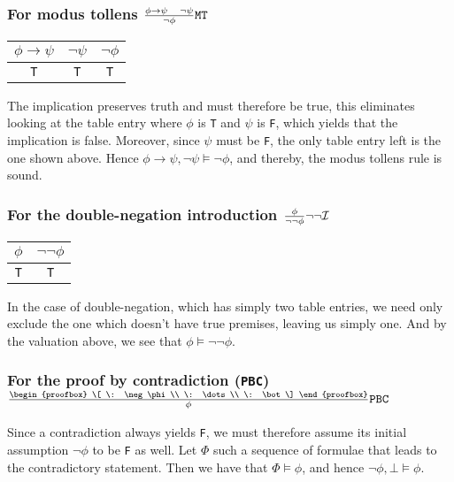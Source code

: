 \documentclass[11pt,a4paper]{article}
\def\intro#1{{#1}{\cal I}}
\let\imp\to
\def\intro#1{{{#1}{\cal I}}}
\begin{document}
\subsubsection*{For modus tollens $\frac{\phi \imp \psi \quad \neg \psi}{\neg \phi}\text{\tt MT}$}
\begin{center}
	\begin{tabular}{c||c||c}
		$\phi \imp \psi$ & $\neg\psi$ & $\neg\phi$ \\ \hline
		{\tt T} & {\tt T} & {\tt T}
	\end{tabular}
\end{center}
The implication preserves truth and must therefore be true, this eliminates looking at the table entry where $\phi$ is {\tt T} and $\psi$ is {\tt F}, which yields that the implication is false. Moreover, since $\psi$ must be {\tt F}, the only table entry left is the one shown above. Hence $\phi \imp \psi, \neg \psi \models \neg \phi$, and thereby, the modus tollens rule is sound.

\subsubsection*{For the double-negation introduction $\frac{\phi}{\neg\neg\phi}\intro{\neg\neg}$}
\begin{center}
	\begin{tabular}{c||c}
		$\phi$ & $\neg\neg\phi$ \\ \hline
		{\tt T} & {\tt T}
	\end{tabular}
\end{center}
In the case of double-negation, which has simply two table entries, we need only exclude the one which doesn't have true premises, leaving us simply one. And by the valuation above, we see that $\phi \models \neg\neg\phi$.

\subsubsection*
{
	For the proof by contradiction ({\tt PBC})
	$\frac{
	\begin{proofbox}
	\[
		\: \neg\phi \\
		\: \dots \\
		\: \bot
	\]
	\end{proofbox}
	}{\phi}\text{\tt PBC}$
}

Since a contradiction always yields {\tt F}, we must therefore assume its initial assumption $\neg\phi$ to be {\tt F} as well. Let $\Phi$ such a sequence of formulae that leads to the contradictory statement. Then we have that $\Phi \models \phi$, and hence $\neg\phi, \bot \models \phi$.
\end{document}
